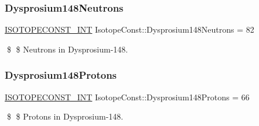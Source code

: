 \subsubsection{\texorpdfstring{Dysprosium148\+Neutrons}{Dysprosium148Neutrons}}
{\footnotesize\ttfamily \mbox{\hyperlink{group___isotope_const-_macros_ga5f18360b3e99483a35c32d789e62621c}{I\+S\+O\+T\+O\+P\+E\+C\+O\+N\+S\+T\+\_\+\+I\+NT}} Isotope\+Const\+::\+Dysprosium148\+Neutrons = 82}

\$ \$ Neutrons in Dysprosium-\/148. \mbox{\label{group___isotope_const-_dysprosium-_dy148_ga4c3e0da2d98907dcf61264d55fada4b3}} 
\subsubsection{\texorpdfstring{Dysprosium148\+Protons}{Dysprosium148Protons}}
{\footnotesize\ttfamily \mbox{\hyperlink{group___isotope_const-_macros_ga5f18360b3e99483a35c32d789e62621c}{I\+S\+O\+T\+O\+P\+E\+C\+O\+N\+S\+T\+\_\+\+I\+NT}} Isotope\+Const\+::\+Dysprosium148\+Protons = 66}

\$ \$ Protons in Dysprosium-\/148. 